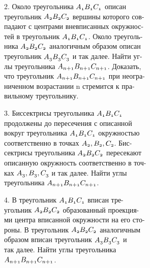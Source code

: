 \documentclass{article}
\begin{document}
\begin{multicols}{2}
\parindent15pt
2. Около треугольника $\mathnormal{A_{1}B_{1}C_{1}}$ описан\\
треугольник $\mathnormal{A_{2}B_{2}C_{2}}$ вершины которого сов-\\
падают с центрами вневписанных окружнос-\\
тей в треугольник $\mathnormal{A_{1}B_{1}C_{1}}$. Около треуголь-\\
ника $\mathnormal{A_{2}B_{2}C_{2}}$ аналогичным образом описан\\
треугольник $\mathnormal{A_{3}B_{3}C_{3}}$ и так далее. Найти уг-\\
лы треугольника $\mathnormal{A_{n+1}B_{n+1}C_{n+1}}$. Доказать,\\
что треугольник $\mathnormal{A_{n+1}B_{n+1}C_{n+1}}$ при неогра-\\
ниченном возрастании n стремится к пра-\\
вильному треугольнику.

\parindent15pt
3. Биссектрисы треугольника $\mathnormal{A_{1}B_{1}C_{1}}$\\
продолжены до пересечения с описанной\\
вокруг треугольника $\mathnormal{A_{1}B_{1}C_{1}}$ окружностью\\
соответственно в точках $\mathnormal{A_{2}, B_{2}, C_{2}}$. Бис-\\
сектрисы треугольника $\mathnormal{A_{2}B_{2}C_{2}}$ пересекают\\
описанную окружность соответственно в точ-\\
ках $\mathnormal{A_{3}, B_{3}, C_{3}}$ и так далее. Найти углы\\
треугольника $\mathnormal{A_{n+1}B_{n+1}C_{n+1}}$.

\parindent15pt
4. В треугольник $\mathnormal{A_{1}B_{1}C_{1}}$ вписан тре-\\
угольник $\mathnormal{A_{2}B_{2}C_{2}}$ образованный проекция-\\
ми центра вписанной окружности на его сто-\\
роны. В треугольник $\mathnormal{A_{2}B_{2}C_{2}}$ аналогичным\\
образом вписан треугольник $\mathnormal{A_{3}B_{3}C_{3}}$ и\\
так далее. Найти углы треугольника\\
$\mathnormal{A_{n+1}B_{n+1}C_{n+1}}$. \\ \\



\end{multicols}
\end{document}
